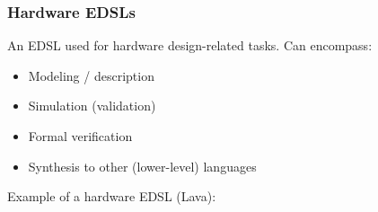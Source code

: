         \begin{frame}
            \frametitle{Hardware EDSLs}
            An EDSL used for hardware design-related tasks. Can encompass:

            \begin{itemize}
                \item Modeling / description
                \item Simulation (validation)
                \item Formal verification
                \item Synthesis to other (lower-level) languages
            \end{itemize}

            \vspace{0.5cm}
            \par{Example of a hardware EDSL (Lava):}
            \vspace{0.2cm}
        \end{frame}

